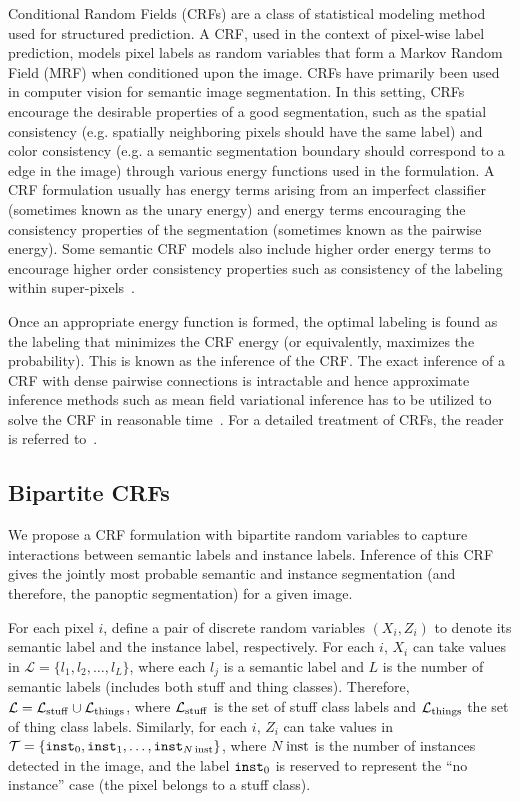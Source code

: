 Conditional Random Fields (CRFs) are a class of statistical modeling method used for structured prediction. A CRF, used in the context of pixel-wise label prediction, models pixel labels as random variables that form a Markov Random Field (MRF) when conditioned upon the image. CRFs have primarily been used in computer vision for semantic image segmentation. In this setting, CRFs encourage the desirable properties of a good segmentation, such as the spatial consistency (e.g. spatially neighboring pixels should have the same label) and color consistency (e.g. a semantic segmentation boundary should correspond to a edge in the image) through various energy functions used in the formulation. A CRF formulation usually has energy terms arising from an imperfect classifier (sometimes known as the unary energy) and energy terms encouraging the consistency properties of the segmentation (sometimes known as the pairwise energy). Some semantic CRF models also include higher order energy terms to encourage higher order consistency properties such as consistency of the labeling within super-pixels~\cite{arnab_eccv_2016}.

Once an appropriate energy function is formed, the optimal labeling is found as the labeling that minimizes the CRF energy (or equivalently, maximizes the probability). This is known as the inference of the CRF. The exact inference of a CRF with dense pairwise connections is intractable and hence approximate inference methods such as mean field variational inference has to be utilized to solve the CRF in reasonable time~\cite{densecrf}. For a detailed treatment of CRFs, the reader is referred to~\cite{Koller_book}. 



\subsection{Bipartite CRFs}
\label{sec:body}
We propose a CRF formulation with bipartite random variables to capture interactions between semantic labels and instance labels. Inference of this CRF gives the jointly most probable semantic and instance segmentation (and therefore, the panoptic segmentation) for a given image. 

For each pixel $i$, define a pair of discrete random variables $(X_i, Z_i)$ to denote its semantic label and the instance label, respectively. For each $i$, $X_i$ can take values in $\mathcal{L} = \{l_1, l_2, \dots, l_L\}$, where each $l_j$ is a semantic label and $L$ is the number of semantic labels (includes both stuff and thing classes). Therefore, $\mathcal{L} = \mathcal{L}_{\operatorname{stuff}} \cup \mathcal{L}_{\operatorname{things}}$, where $\mathcal{L}_{\operatorname{stuff}}$ is the set of stuff class labels and $\mathcal{L}_{\operatorname{things}}$ the set of thing class labels. Similarly, for each $i$, $Z_i$ can take values in $\mathcal{T} = \{\texttt{inst}_0, \texttt{inst}_1, \dots, \texttt{inst}_{N\operatorname{inst}} \}$, where $N\operatorname{inst}$ is the number of instances detected in the image, and the label $\texttt{inst}_0$ is reserved to represent the ``no instance'' case (the pixel belongs to a stuff class).  


